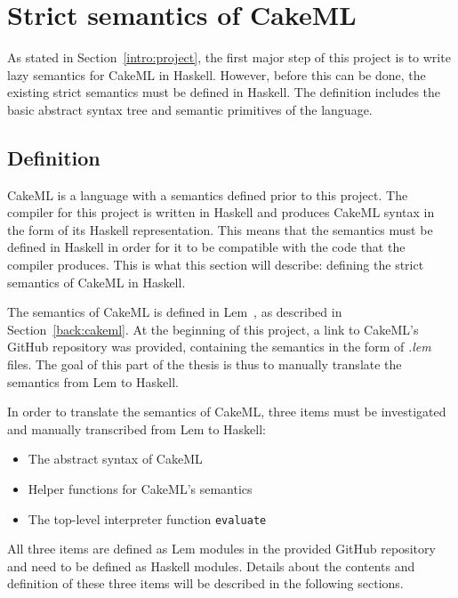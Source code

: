 \chapter{Strict semantics of CakeML}
\label{chapter:strict}
As stated in Section~\ref{intro:project}, the first major step of this project
is to write lazy semantics for CakeML in Haskell. However, before this can be
done, the existing strict semantics must be defined in Haskell. The definition
includes the basic abstract syntax tree and semantic primitives of the
language.

\section{Definition}
CakeML is a language with a semantics defined prior to this project.
The compiler for this project is written in Haskell and produces CakeML
syntax in the form of its Haskell representation. This means that
the semantics must be defined in Haskell in order for it to be compatible with
the code that the compiler produces. This is
what this section will describe: defining the strict semantics of CakeML in
Haskell.

The semantics of CakeML is defined in Lem~\cite{Lem33:online}, as described in
Section~\ref{back:cakeml}. At the beginning of this project, a link to CakeML's
GitHub repository was provided, containing the semantics in the form
of \textit{.lem} files. The goal of this part of the thesis is thus to manually
translate the semantics from Lem to Haskell.

In order to translate the semantics of CakeML, three items must be
investigated and manually transcribed from Lem to Haskell:
\begin{itemize}
\item The abstract syntax of CakeML
\item Helper functions for CakeML's semantics
\item The top-level interpreter function \texttt{evaluate}
\end{itemize}

\noindent All three items are defined as Lem modules in the provided GitHub
repository and need to be defined as Haskell modules.
Details about the contents and definition of these three items
will be described in the following sections.

